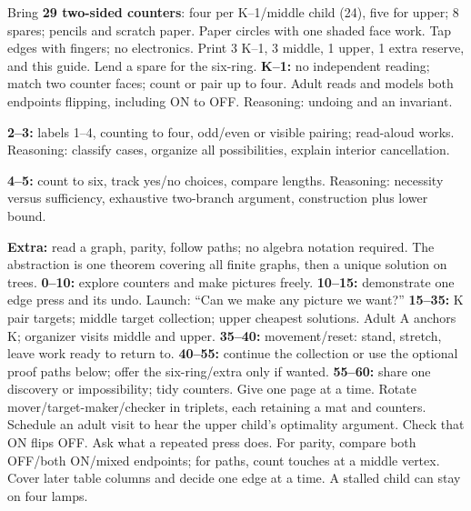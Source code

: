 \documentclass[12pt]{extarticle}
\begin{document}
Bring \textbf{29 two-sided counters}: four per K--1/middle child (24), five for upper; 8 spares; pencils and scratch paper. Paper circles with one shaded face work. Tap edges with fingers; no electronics. Print 3 K--1, 3 middle, 1 upper, 1 extra reserve, and this guide. Lend a spare for the six-ring.
\textbf{K--1:} no independent reading; match two counter faces; count or pair up to four. Adult reads and models both endpoints flipping, including ON to OFF. Reasoning: undoing and an invariant.\par
\textbf{2--3:} labels 1--4, counting to four, odd/even or visible pairing; read-aloud works. Reasoning: classify cases, organize all possibilities, explain interior cancellation.\par
\textbf{4--5:} count to six, track yes/no choices, compare lengths. Reasoning: necessity versus sufficiency, exhaustive two-branch argument, construction plus lower bound.\par
\textbf{Extra:} read a graph, parity, follow paths; no algebra notation required. The abstraction is one theorem covering all finite graphs, then a unique solution on trees.
\textbf{0--10:} explore counters and make pictures freely. \textbf{10--15:} demonstrate one edge press and its undo. Launch: ``Can we make any picture we want?'' \textbf{15--35:} K pair targets; middle target collection; upper cheapest solutions. Adult A anchors K; organizer visits middle and upper. \textbf{35--40:} movement/reset: stand, stretch, leave work ready to return to. \textbf{40--55:} continue the collection or use the optional proof paths below; offer the six-ring/extra only if wanted. \textbf{55--60:} share one discovery or impossibility; tidy counters.
Give one page at a time. Rotate mover/target-maker/checker in triplets, each retaining a mat and counters. Schedule an adult visit to hear the upper child's optimality argument.
Check that ON flips OFF. Ask what a repeated press does. For parity, compare both OFF/both ON/mixed endpoints; for paths, count touches at a middle vertex. Cover later table columns and decide one edge at a time. A stalled child can stay on four lamps.
\end{document}
